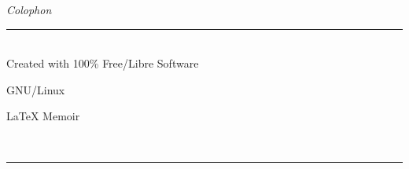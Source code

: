 \begin{vplace}
\centering
\emph{\LARGE Colophon}

\rule{0.5\textwidth}{0.4pt}\\[\baselineskip]

{\tiny Created with 100\% Free/Libre Software}

GNU/Linux

{\LaTeX} Memoir

\rule{0\textwidth}{0pt}\\[\baselineskip]%
\rule{0.5\textwidth}{0.4pt}\\[\baselineskip]
\end{vplace}
